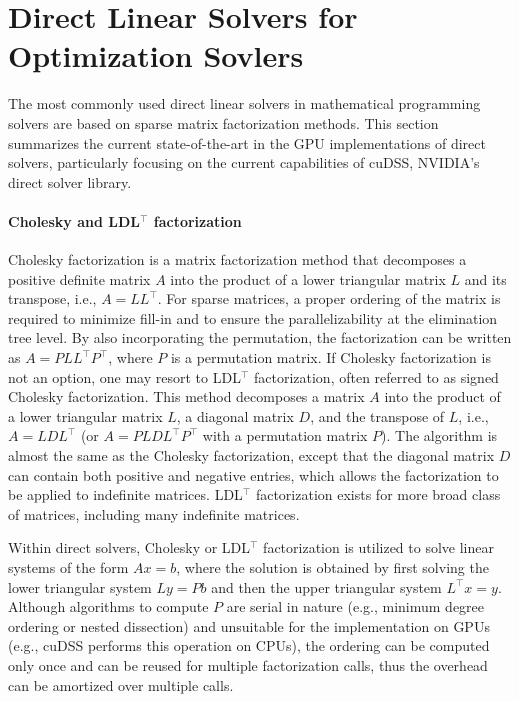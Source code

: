 \documentclass{article}
\begin{document}
\section{Direct Linear Solvers for Optimization Sovlers}\label{eqn:linear}
The most commonly used direct linear solvers in mathematical programming solvers are based on sparse matrix factorization methods.
This section summarizes the current state-of-the-art in the GPU implementations of direct solvers, particularly focusing on the current capabilities of cuDSS, NVIDIA's direct solver library.



\paragraph{Cholesky and LDL$^\top$ factorization}
Cholesky factorization is a matrix factorization method that decomposes a positive definite matrix $A$ into the product of a lower triangular matrix $L$ and its transpose, i.e., $A = LL^\top$. For sparse matrices, a proper ordering of the matrix is required to minimize fill-in and to ensure the parallelizability at the elimination tree level. By also incorporating the permutation, the factorization can be written as $A = P L L^\top P^\top$, where $P$ is a permutation matrix.
If Cholesky factorization is not an option, one may resort to LDL$^\top$ factorization, often referred to as signed Cholesky factorization.
This method decomposes a matrix $A$ into the product of a lower triangular matrix $L$, a diagonal matrix $D$, and the transpose of $L$, i.e., $A = L D L^\top$ (or $A = P L D L^\top P^\top$ with a permutation matrix $P$).
The algorithm is almost the same as the Cholesky factorization, except that the diagonal matrix $D$ can contain both positive and negative entries, which allows the factorization to be applied to indefinite matrices.
LDL$^\top$ factorization exists for more broad class of matrices, including many indefinite matrices.

Within direct solvers, Cholesky or LDL$^\top$ factorization is utilized to solve linear systems of the form $Ax = b$, where the solution is obtained by first solving the lower triangular system $Ly = Pb$ and then the upper triangular system $L^\top x = y$.
Although algorithms to compute $P$ are serial in nature (e.g., minimum degree ordering or nested dissection) and unsuitable for the implementation on GPUs (e.g., cuDSS performs this operation on CPUs), the ordering can be computed only once and can be reused for multiple factorization calls, thus the overhead can be amortized over multiple calls.
\end{document}
